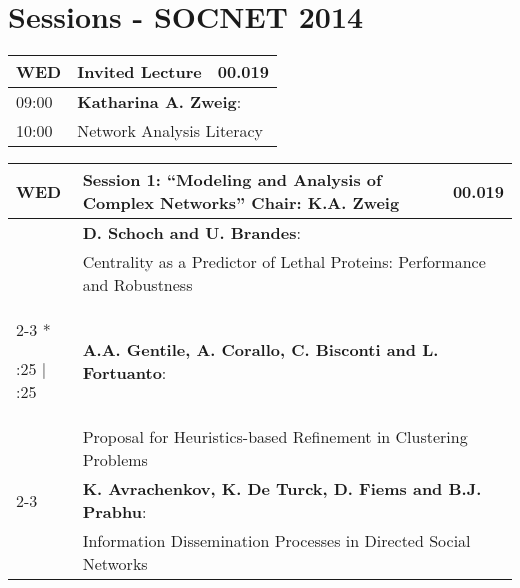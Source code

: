 \section{\textcolor{unibablueI}{Sessions - SOCNET 2014}}
\footnotesize
%
\newcommand\VertEntry[1]{%
  \multirow{3}*{%
    \begin{varwidth}{2em}%
    \centering #1%
    \end{varwidth}}}
%
\begin{longtable}{|p{2em}|p{5.5cm}|p{1cm}|}
\hline
\rowcolor{unibayellowV} \textcolor{unibablueI}{\textbf{WED}} & \textcolor{unibablueI}{\textbf{Invited Lecture}} & \textcolor{unibablueI}{\textbf{00.019}}\\
\hline
\endhead
09:00 & \multicolumn{2}{p{6.5cm}|}{\textbf{Katharina A. Zweig}:} \\
10:00 & \multicolumn{2}{p{6.5cm}|}{Network Analysis Literacy} \\
 \hline
\end{longtable}
\vspace{-2em}
\begin{longtable}{|p{2em}|p{5.5cm}|p{1cm}|}
\hline
\rowcolor{unibablueV} \textcolor{unibablueI}{\textbf{WED}} & \textcolor{unibablueI}{\textbf{Session 1: ``Modeling and Analysis of Complex Networks''} \hspace*{17ex}\textcolor{unibablueI}{Chair: K.A. Zweig}} & \textcolor{unibablueI}{\textbf{00.019}}\\
\hline
\endhead
 & \multicolumn{2}{p{6.5cm}|}{\textbf{D. Schoch and U. Brandes}:} \\
 & \multicolumn{2}{p{6.5cm}|}{Centrality as a Predictor of Lethal Proteins: Performance and Robustness} \\
 \cline{2-3}
\VertEntry{10:25 \qquad\quad $\vert$ \qquad 11:25} & \multicolumn{2}{p{6.5cm}|}{\textbf{A.A. Gentile, A. Corallo, C. Bisconti and L. Fortuanto}:} \\
 & \multicolumn{2}{p{6.5cm}|}{Proposal for Heuristics-based Refinement in Clustering Problems} \\
  \cline{2-3}
 & \multicolumn{2}{p{6.5cm}|}{\textbf{K. Avrachenkov, K. De Turck, D. Fiems and B.J. Prabhu}:} \\
 & \multicolumn{2}{p{6.5cm}|}{Information Dissemination Processes in Directed Social Networks} \\

 \hline
\end{longtable}
